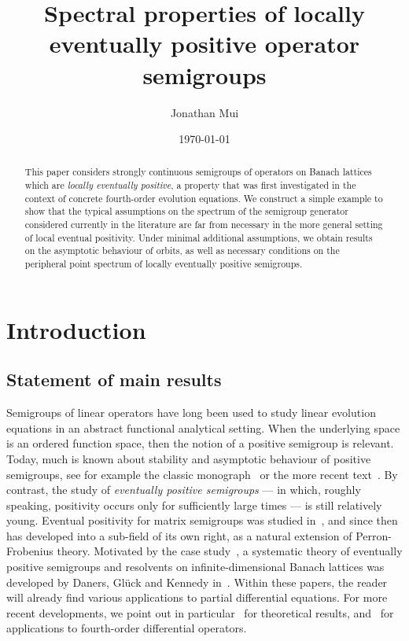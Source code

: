 \documentclass[a4paper, reqno]{amsart}
\title[Spectrum and local eventual positivity]{Spectral properties of locally eventually positive operator semigroups}
\author[J. Mui]{Jonathan Mui}
\date{\today}
\numberwithin{equation}{section}
\theoremstyle{plain}
\theoremstyle{definition}
\theoremstyle{remark}
\begin{document}
	
\begin{abstract}
	This paper considers strongly continuous semigroups of operators on Banach lattices which are \emph{locally eventually positive}, a property that was first investigated in the context of concrete fourth-order evolution equations. We construct a simple example to show that the typical assumptions on the spectrum of the semigroup generator considered currently in the literature are far from necessary in the more general setting of local eventual positivity. Under minimal additional assumptions, we obtain results on the asymptotic behaviour of orbits, as well as necessary conditions on the peripheral point spectrum of locally eventually positive semigroups.
\end{abstract}

\maketitle

\section{Introduction}

\subsection*{Statement of main results}
Semigroups of linear operators have long been used to study linear evolution equations in an abstract functional analytical setting. When the underlying space is an ordered function space, then the notion of a positive semigroup is relevant. Today, much is known about stability and asymptotic behaviour of positive semigroups, see for example the classic monograph~\cite{AGG} or the more recent text~\cite{BFR}. By contrast, the study of \emph{eventually positive semigroups} --- in which, roughly speaking, positivity occurs only for sufficiently large times --- is still relatively young. Eventual positivity for matrix semigroups was studied in~\cite{NT}, and since then has developed into a sub-field of its own right, as a natural extension of Perron-Frobenius theory. Motivated by the case study~\cite{Dan}, a systematic theory of eventually positive semigroups and resolvents on infinite-dimensional Banach lattices was developed by Daners, Gl\"{u}ck and Kennedy in~\cite{DGK1,DGK2}. Within these papers, the reader will already find various applications to partial differential equations. For more recent developments, we point out in particular~\cite{DG18,ArG21} for theoretical results, and~\cite{DKP,GM} for applications to fourth-order differential operators.
\end{document}

